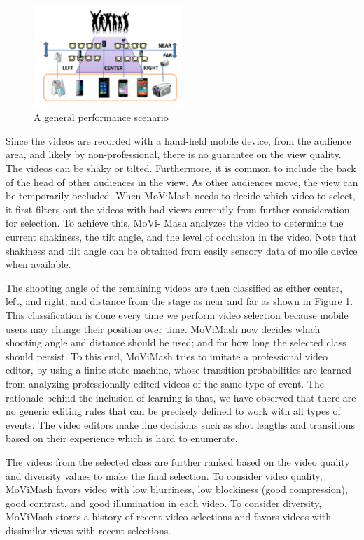 \documentclass{new}
\begin{document}
\begin{figure}[h]
\includegraphics[width=0.5\textwidth]{img1}
\caption{A general performance scenario}
\end{figure}
Since the videos are recorded with a hand-held mobile device,
from the audience area, and likely by non-professional, there is no
guarantee on the view quality. The videos can be shaky or tilted.
Furthermore, it is common to include the back of the head of other
audiences in the view. As other audiences move, the view can be
temporarily occluded. When MoViMash needs to decide which
video to select, it first filters out the videos with bad views currently
from further consideration for selection. To achieve this, MoVi-
Mash analyzes the video to determine the current shakiness, the tilt
angle, and the level of occlusion in the video. Note that shakiness and tilt angle can be obtained from easily sensory data of mobile
device when available.

The shooting angle of the remaining videos are then classified as
either center, left, and right; and distance from the stage as near and
far as shown in Figure 1. This classification is done every time we
perform video selection because mobile users may change their position
over time. MoViMash now decides which shooting angle and
distance should be used; and for how long the selected class should
persist. To this end, MoViMash tries to imitate a professional video
editor, by using a finite state machine, whose transition probabilities
are learned from analyzing professionally edited videos of the
same type of event. The rationale behind the inclusion of learning
is that, we have observed that there are no generic editing rules
that can be precisely defined to work with all types of events. The
video editors make fine decisions such as shot lengths and transitions
based on their experience which is hard to enumerate.

The videos from the selected class are further ranked based on
the video quality and diversity values to make the final selection.
To consider video quality, MoViMash favors video with low blurriness,
low blockiness (good compression), good contrast, and good
illumination in each video. To consider diversity, MoViMash stores
a history of recent video selections and favors videos with dissimilar
views with recent selections.
\end{document}
